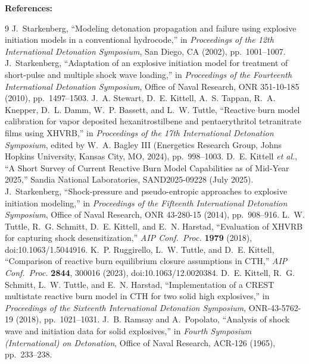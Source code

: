 \documentclass[11pt,addpoints]{exam}
\begin{document}
\begin{tcolorbox}[breakable]
\textbf{References:}\vspace{.5em}

\begingroup
\renewcommand{\section}[2]{}%
\begin{thebibliography}{9}
\setlength{\itemsep}{0.25em}
J.~Starkenberg, ``Modeling detonation propagation and failure using explosive initiation models in a conventional hydrocode,'' in \emph{Proceedings of the 12th International Detonation Symposium}, San Diego, CA (2002), pp.~1001--1007.
J.~Starkenberg, ``Adaptation of an explosive initiation model for treatment of short-pulse and multiple shock wave loading,'' in \emph{Proceedings of the Fourteenth International Detonation Symposium}, Office of Naval Research, ONR 351-10-185 (2010), pp.~1497--1503.
J.~A. Stewart, D.~E. Kittell, A.~S. Tappan, R.~A. Knepper, D.~L. Damm, W.~P. Bassett, and L.~W. Tuttle, ``Reactive burn model calibration for vapor deposited hexanitrostilbene and pentaerythritol tetranitrate films using XHVRB,'' in \emph{Proceedings of the 17th International Detonation Symposium}, edited by W.~A. Bagley III (Energetics Research Group, Johns Hopkins University, Kansas City, MO, 2024), pp.~998--1003.
D.~E. Kittell \emph{et al.}, ``A Short Survey of Current Reactive Burn Model Capabilities as of Mid-Year 2025,'' Sandia National Laboratories, SAND2025-09228 (July 2025).
J.~Starkenberg, ``Shock-pressure and pseudo-entropic approaches to explosive initiation modeling,'' in \emph{Proceedings of the Fifteenth International Detonation Symposium}, Office of Naval Research, ONR 43-280-15 (2014), pp.~908--916.
L.~W. Tuttle, R.~G. Schmitt, D.~E. Kittell, and E.~N. Harstad, ``Evaluation of XHVRB for capturing shock desensitization,'' \emph{AIP Conf.\ Proc.} \textbf{1979} (2018), doi:10.1063/1.5044916.
K.~P. Ruggirello, L.~W. Tuttle, and D.~E. Kittell, ``Comparison of reactive burn equilibrium closure assumptions in CTH,'' \emph{AIP Conf.\ Proc.} \textbf{2844}, 300016 (2023), doi:10.1063/12.0020384.
D.~E. Kittell, R.~G. Schmitt, L.~W. Tuttle, and E.~N. Harstad, ``Implementation of a CREST multistate reactive burn model in CTH for two solid high explosives,'' in \emph{Proceedings of the Sixteenth International Detonation Symposium}, ONR-43-5762-19 (2018), pp.~1021--1031.
J.~B. Ramsay and A.~Popolato, ``Analysis of shock wave and initiation data for solid explosives,'' in \emph{Fourth Symposium (International) on Detonation}, Office of Naval Research, ACR-126 (1965), pp.~233--238.
\end{thebibliography}
\endgroup
\end{tcolorbox}
\end{document}
